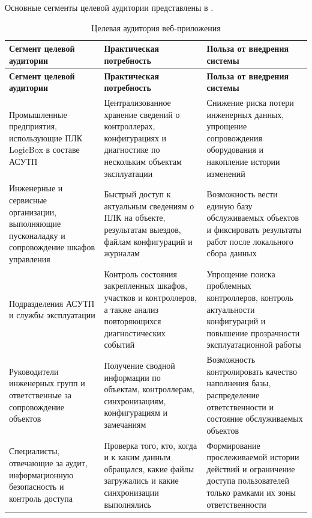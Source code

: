 Основные сегменты целевой аудитории представлены в .
\small
\begin{longtable}{|p{}|p{}|p{}|}
    \caption{Целевая аудитория веб-приложения} \label{tab:audience2} \\
    \hline
    \textbf{Сегмент целевой аудитории} & \textbf{Практическая потребность} & \textbf{Польза от внедрения системы} \\ \hline
    \endfirsthead
    \tabcont{\ref{tab:audience2}}
    \textbf{Сегмент целевой аудитории} & \textbf{Практическая потребность} & \textbf{Польза от внедрения системы} \\ \hline
    \endhead
    \hline
    \endfoot
    \hline
    \endlastfoot
    Промышленные предприятия, использующие ПЛК LogicBox в составе АСУТП & Централизованное хранение сведений о контроллерах, конфигурациях и диагностике по нескольким объектам эксплуатации & Снижение риска потери инженерных данных, упрощение сопровождения оборудования и накопление истории изменений \\ \hline
    Инженерные и сервисные организации, выполняющие пусконаладку и сопровождение шкафов управления & Быстрый доступ к актуальным сведениям о ПЛК на объекте, результатам выездов, файлам конфигураций и журналам & Возможность вести единую базу обслуживаемых объектов и фиксировать результаты работ после локального сбора данных \\ \hline
    Подразделения АСУТП и службы эксплуатации & Контроль состояния закрепленных шкафов, участков и контроллеров, а также анализ повторяющихся диагностических событий & Упрощение поиска проблемных контроллеров, контроль актуальности конфигураций и повышение прозрачности эксплуатационной работы \\ \hline
    Руководители инженерных групп и ответственные за сопровождение объектов & Получение сводной информации по объектам, контроллерам, синхронизациям, конфигурациям и замечаниям & Возможность контролировать качество наполнения базы, распределение ответственности и состояние обслуживаемых объектов \\ \hline
    Специалисты, отвечающие за аудит, информационную безопасность и контроль доступа & Проверка того, кто, когда и к каким данным обращался, какие файлы загружались и какие синхронизации выполнялись & Формирование прослеживаемой истории действий и ограничение доступа пользователей только рамками их зоны ответственности \\ \hline
\end{longtable}
\normalsize

